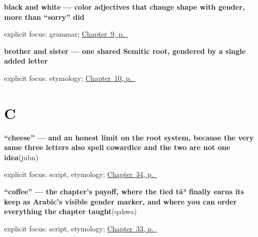 \noindent\begin{minipage}[t]{\linewidth}
\raggedright
\textbf{black and white — color adjectives that change shape with gender, more than \textquotedblleft{}sorry\textquotedblright{} did}\enspace\emph{ }\par
\footnotesize explicit focus: grammar; \hyperref[ch:ar-core-colours]{Chapter~9, p.~\pageref*{ch:ar-core-colours}}
\end{minipage}\par\smallskip

\noindent\begin{minipage}[t]{\linewidth}
\raggedright
\textbf{brother and sister — one shared Semitic root, gendered by a single added letter}\enspace\emph{ }\par
\footnotesize explicit focus: etymology; \hyperref[ch:ar-family]{Chapter~10, p.~\pageref*{ch:ar-family}}
\end{minipage}\par\smallskip

\section*{C}

\noindent\begin{minipage}[t]{\linewidth}
\raggedright
\textbf{\textquotedblleft{}cheese\textquotedblright{} — and an honest limit on the root system, because the very same three letters also spell cowardice and the two are not one idea}\enspace\emph{}\enspace(jubn)\par
\footnotesize explicit focus: script, etymology; \hyperref[ch:ar-asking-for-food]{Chapter~34, p.~\pageref*{ch:ar-asking-for-food}}
\end{minipage}\par\smallskip

\noindent\begin{minipage}[t]{\linewidth}
\raggedright
\textbf{\textquotedblleft{}coffee\textquotedblright{} — the chapter's payoff, where the tied tāʾ finally earns its keep as Arabic's visible gender marker, and where you can order everything the chapter taught}\enspace\emph{}\enspace(qahwa)\par
\footnotesize explicit focus: script, etymology; \hyperref[ch:ar-asking-for-a-drink]{Chapter~33, p.~\pageref*{ch:ar-asking-for-a-drink}}
\end{minipage}\par\smallskip

